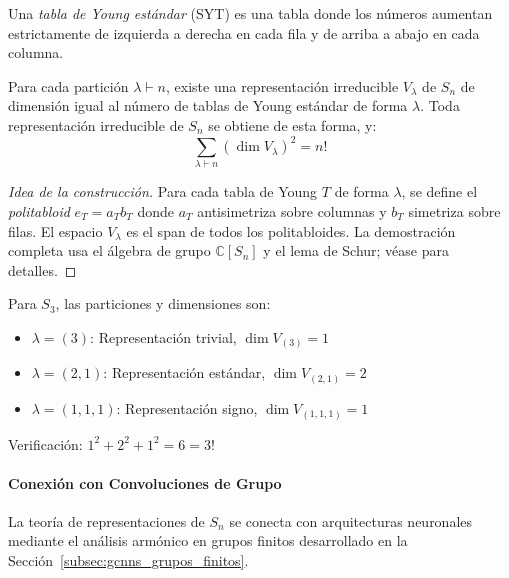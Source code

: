 \begin{definition}\label{def:standard_young_tableau}
Una \textit{tabla de Young estándar} (SYT) es una tabla donde los números aumentan estrictamente de izquierda a derecha en cada fila y de arriba a abajo en cada columna.
\end{definition}

\begin{theorem}\label{thm:irrep_construction_sn}
Para cada partición $\lambda \vdash n$, existe una representación irreducible $V_\lambda$ de $S_n$ de dimensión igual al número de tablas de Young estándar de forma $\lambda$. Toda representación irreducible de $S_n$ se obtiene de esta forma, y:
\begin{equation}
\sum_{\lambda \vdash n} (\dim V_\lambda)^2 = n!
\end{equation}
\end{theorem}

\begin{proof}[Idea de la construcción]
Para cada tabla de Young $T$ de forma $\lambda$, se define el \textit{politabloid} $e_T = a_T b_T$ donde $a_T$ antisimetriza sobre columnas y $b_T$ simetriza sobre filas. El espacio $V_\lambda$ es el span de todos los politabloides. La demostración completa usa el álgebra de grupo $\mathbb{C}[S_n]$ y el lema de Schur; véase \citep{fulton1997young} para detalles.
\end{proof}

\begin{example}[Dimensiones para $n=3$]
Para $S_3$, las particiones y dimensiones son:
\begin{itemize}
    \item $\lambda = (3)$: Representación trivial, $\dim V_{(3)} = 1$
    \item $\lambda = (2,1)$: Representación estándar, $\dim V_{(2,1)} = 2$
    \item $\lambda = (1,1,1)$: Representación signo, $\dim V_{(1,1,1)} = 1$
\end{itemize}
Verificación: $1^2 + 2^2 + 1^2 = 6 = 3!$
\end{example}

\paragraph{Conexión con Convoluciones de Grupo}

La teoría de representaciones de $S_n$ se conecta con arquitecturas neuronales mediante el análisis armónico en grupos finitos desarrollado en la Sección~\ref{subsec:gcnns_grupos_finitos}.

